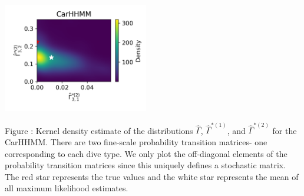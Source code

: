 \documentclass{article}
\begin{document}
\begin{center}
        \includegraphics[width=2.5in]{../Plots/hhmm_V_Gamma_density_1_row_2.png}
        \end{center}
        
        \noindent Figure : Kernel density estimate of the distributions $\hat \Gamma$, $\hat \Gamma^{*(1)}$, and $\hat \Gamma^{*(2)}$ for the CarHHMM. There are two fine-scale probability transition matrices- one corresponding to each dive type. We only plot the off-diagonal elements of the probability transition matrices since this uniquely defines a stochastic matrix. The red star represents the true values and the white star represents the mean of all maximum likelihood estimates.
        \addtocounter{fignum}{1}
        
        \newpage
\end{document}
